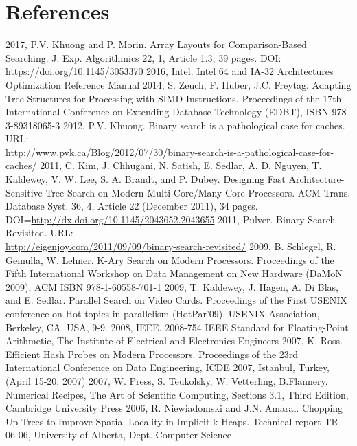 \documentclass[preprint,1p,times]{elsarticle}
\begin{document}
\section{References}
\begin{thebibliography}{9}
 2017, P.V. Khuong and P. Morin. Array Layouts for Comparison-Based Searching. J. Exp. Algorithmics 22, 1, Article 1.3, 39 pages. DOI: \url{https://doi.org/10.1145/3053370}
 2016, Intel. Intel 64 and IA-32 Architectures Optimization Reference Manual
 2014, S. Zeuch, F. Huber, J.C. Freytag. Adapting Tree Structures for Processing with SIMD Instructions. Proceedings of the 17th International Conference on Extending Database Technology (EDBT), ISBN 978-3-89318065-3
 2012, P.V. Khuong. Binary search is a pathological case for caches. URL:\\
\url{http://www.pvk.ca/Blog/2012/07/30/binary-search-is-a-pathological-case-for-caches/}
 2011, C. Kim, J. Chhugani, N. Satish, E. Sedlar, A. D. Nguyen, T. Kaldewey, V. W. Lee, S. A. Brandt, and P. Dubey. Designing Fast Architecture-Sensitive Tree Search on Modern Multi-Core/Many-Core Processors. ACM Trans. Database Syst. 36, 4, Article 22 (December 2011), 34 pages. DOI=\url{http://dx.doi.org/10.1145/2043652.2043655} 
 2011, Pulver. Binary Search Revisited. URL:\\
\url{http://eigenjoy.com/2011/09/09/binary-search-revisited/}
 2009, B. Schlegel, R. Gemulla, W. Lehner. K-Ary Search on Modern Processors. Proceedings of the Fifth International Workshop on Data Management on New Hardware (DaMoN 2009), ACM ISBN 978-1-60558-701-1
 2009, T. Kaldewey, J. Hagen, A. Di Blas, and E. Sedlar. Parallel Search on Video Cards. Proceedings of the First USENIX conference on Hot topics in parallelism (HotPar'09). USENIX Association, Berkeley, CA, USA, 9-9. 
 2008, IEEE. 2008-754 IEEE Standard for Floating-Point Arithmetic, The Institute of Electrical and Electronics Engineers
 2007, K. Ross. Efficient Hash Probes on Modern Processors. Proceedings of the 23rd International Conference on Data Engineering, ICDE 2007, Istanbul, Turkey, (April 15-20, 2007)
 2007, W. Press, S. Teukolsky, W. Vetterling, B.Flannery. Numerical Recipes, The Art of Scientific Computing, Sections 3.1, Third Edition, Cambridge University Press
 2006, R. Niewiadomski and J.N. Amaral. Chopping Up Trees to Improve Spatial Locality in Implicit k-Heaps. Technical report TR-06-06, University of Alberta, Dept. Computer Science

\end{thebibliography}
\end{document}
